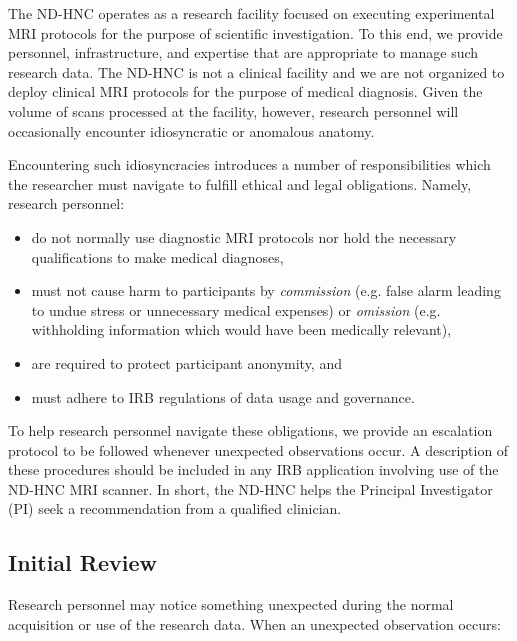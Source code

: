 \documentclass[11pt]{article}
\begin{document}

The ND-HNC operates as a research facility focused on executing experimental MRI protocols for the purpose of scientific investigation. To this end, we provide personnel, infrastructure, and expertise that are appropriate to manage such research data. The ND-HNC is not a clinical facility and we are not organized to deploy clinical MRI protocols for the purpose of medical diagnosis. Given the volume of scans processed at the facility, however, research personnel will occasionally encounter idiosyncratic or anomalous anatomy.

Encountering such idiosyncracies introduces a number of responsibilities which the researcher must navigate to fulfill ethical and legal obligations. Namely, research personnel:

\begin{itemize}
    \item do not normally use diagnostic MRI protocols nor hold the necessary qualifications to make medical diagnoses,
    \item must not cause harm to participants by \textit{commission} (e.g. false alarm leading to undue stress or unnecessary medical expenses) or \textit{omission} (e.g. withholding information which would have been medically relevant),
    \item are required to protect participant anonymity, and
    \item must adhere to IRB regulations of data usage and governance.
\end{itemize}

To help research personnel navigate these obligations, we provide an escalation protocol to be followed whenever unexpected observations occur. A description of these procedures should be included in any IRB application involving use of the ND-HNC MRI scanner. In short, the ND-HNC helps the Principal Investigator (PI) seek a recommendation from a qualified clinician.

\subsection{Initial Review}
Research personnel may notice something unexpected during the normal acquisition or use of the research data. When an unexpected observation occurs:
\end{document}
